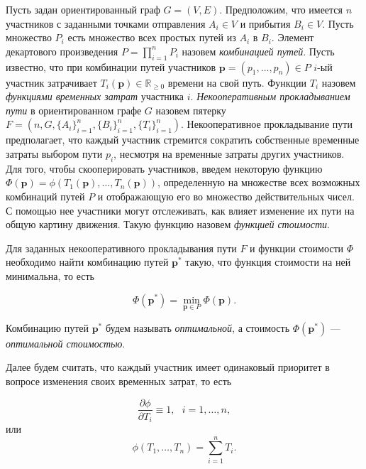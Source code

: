 \documentclass[12pt, a4paper]{article}
\DeclareMathOperator*{\minn}{min}
\begin{document}
Пусть задан ориентированный граф $G = (V, E)$. Предположим, что имеется $n$ участников с заданными точками отправления $A_i \in V$ и прибытия $B_i \in V$. Пусть множество $P_i$ есть множество всех простых путей из $A_i$ в $B_i$. Элемент декартового произведения ${P = \prod \limits_{i = 1} ^ n P_i}$ назовем \textit{комбинацией путей}. Пусть известно, что при комбинации путей участников $\textbf{p} = \left(p_1, \ldots, p_n\right)\in P$ $i$-ый участник затрачивает $T_i(\textbf{p}) \in \mathbb{R}_{\ge 0}$ времени на свой путь. 
Функции $T_i$ назовем \textit{функциями временных затрат} участника $i$.
\textit{Некооперативным прокладыванием пути} в ориентированном графе $G$ назовем пятерку $F = (n, G, \{A_i\}_{i = 1}^{n}, \{B_i\}_{i = 1}^{n}, \{T_i\}_{i = 1}^{n})$. Некооперативное прокладывание пути предполагает, что каждый участник стремится сократить собственные временные затраты выбором пути $p_i$, несмотря на временные затраты других участников. 
Для того, чтобы скооперировать участников, введем некоторую функцию $\Phi (\textbf{p}) = \phi (T_1 (\textbf{p}), \ldots, T_n(\textbf{p}))$, определенную на множестве всех возможных комбинаций путей $P$ и отображающую его во множество действительных чисел. С помощью нее участники могут отслеживать, как влияет изменение их пути на общую картину движения. Такую функцию назовем \textit{функцией стоимости}.

Для заданных некооперативного прокладывания пути $F$ и функции стоимости $\Phi$ необходимо найти комбинацию путей $\textbf{p}^*$ такую, что функция стоимости на ней минимальна, то есть

\begin{equation}
	\label{eq:target_global_task_T} 
	\Phi (\textbf{p}^*) = \minn\limits_{ \textbf{p} \in P} \Phi (\textbf{p}).
\end{equation}

Комбинацию путей $\textbf{p}^*$ будем называть \textit {оптимальной}, а стоимость  $ \Phi (\textbf{p}^*)$ --- \textit{оптимальной стоимостью}.

Далее будем считать, что каждый участник имеет одинаковый приоритет в вопросе изменения своих временных затрат, то есть 

\begin{equation*}
	\frac{\partial \phi}{\partial T_i} \equiv 1, \text{ } i = 1, \ldots, n,
\end{equation*}
или
\begin{equation*}
\phi(T_1, \ldots, T_n) = \sum\limits_{i = 1}^nT_i.
\end{equation*}
\end{document}
